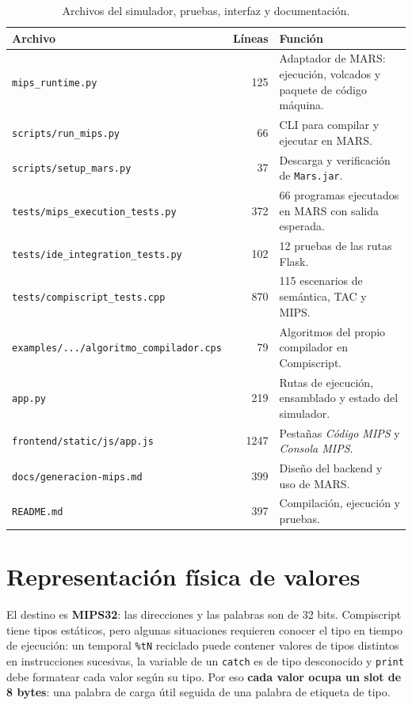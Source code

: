 \documentclass[11pt,a4paper]{article}
\begin{document}
\begin{table}[H]
\centering
\small
\begin{tabular}{@{}L{6.5cm}rL{6.1cm}@{}}
\toprule
\textbf{Archivo} & \textbf{Líneas} & \textbf{Función} \\
\midrule
\texttt{mips\_runtime.py} & 125 &
Adaptador de MARS: ejecución, volcados y paquete de código máquina. \\
\texttt{scripts/run\_mips.py} & 66 & CLI para compilar y ejecutar en MARS. \\
\texttt{scripts/setup\_mars.py} & 37 & Descarga y verificación de \texttt{Mars.jar}. \\
\texttt{tests/mips\_execution\_tests.py} & 372 &
66 programas ejecutados en MARS con salida esperada. \\
\texttt{tests/ide\_integration\_tests.py} & 102 & 12 pruebas de las rutas Flask. \\
\texttt{tests/compiscript\_tests.cpp} & 870 & 115 escenarios de semántica, TAC y MIPS. \\
\texttt{examples/.../algoritmo\_\allowbreak compilador.cps} & 79 &
Algoritmos del propio compilador en Compiscript. \\
\texttt{app.py} & 219 & Rutas de ejecución, ensamblado y estado del simulador. \\
\texttt{frontend/static/js/app.js} & 1247 & Pestañas \emph{Código MIPS} y \emph{Consola MIPS}. \\
\texttt{docs/generacion-mips.md} & 399 & Diseño del backend y uso de MARS. \\
\texttt{README.md} & 397 & Compilación, ejecución y pruebas. \\
\bottomrule
\end{tabular}
\caption{Archivos del simulador, pruebas, interfaz y documentación.}
\end{table}

\section{Representación física de valores}

El destino es \textbf{MIPS32}: las direcciones y las palabras son de 32 bits.
Compiscript tiene tipos estáticos, pero algunas situaciones requieren conocer el
tipo en tiempo de ejecución: un temporal \texttt{\%tN} reciclado puede contener
valores de tipos distintos en instrucciones sucesivas, la variable de un
\texttt{catch} es de tipo desconocido y \texttt{print} debe formatear cada valor
según su tipo. Por eso \textbf{cada valor ocupa un slot de 8 bytes}: una palabra
de carga útil seguida de una palabra de etiqueta de tipo.
\end{document}
